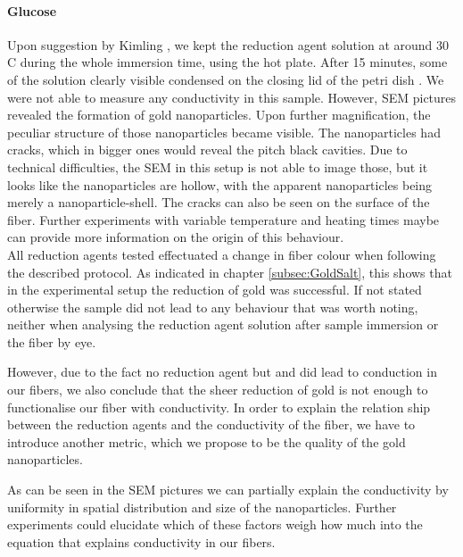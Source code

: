 

\paragraph{Glucose}
Upon suggestion by Kimling \cite{Kimling}, we kept the reduction agent solution at around 30 \degree C during the whole immersion time, using the hot plate. After 15 minutes, some of the solution clearly visible condensed on the closing lid of the petri dish . We were not able to measure any conductivity in this sample. However, SEM pictures revealed the formation of gold nanoparticles. Upon further magnification, the peculiar structure of those nanoparticles became visible. The nanoparticles had cracks, which in bigger ones would reveal the pitch black cavities. Due to technical difficulties, the SEM in this setup is not able to image those, but it looks like the nanoparticles are hollow, with the apparent nanoparticles being merely a nanoparticle-shell. The cracks can also be seen on the surface of the fiber. Further experiments with variable temperature and heating times maybe can provide more information on the origin of this behaviour.\\


All reduction agents tested effectuated a change in fiber colour when following the described protocol. As indicated in chapter \ref{subsec:GoldSalt}, this shows that in the experimental setup the reduction of gold was successful. If not stated otherwise the sample did not lead to any behaviour that was worth noting, neither when analysing the reduction agent solution after sample immersion or the fiber by eye.

However, due to the fact no reduction agent but  and  did lead to conduction in our fibers, we also conclude that the sheer reduction of gold is not enough to functionalise our fiber with conductivity. In order to explain the relation ship between the reduction agents and the conductivity of the fiber, we have to introduce another metric, which we propose to be the quality of the gold nanoparticles.


As can be seen in the SEM pictures  we can partially explain the conductivity by uniformity in spatial distribution and size of the nanoparticles. Further experiments could elucidate which of these factors weigh how much into the equation that explains conductivity in our fibers. 

